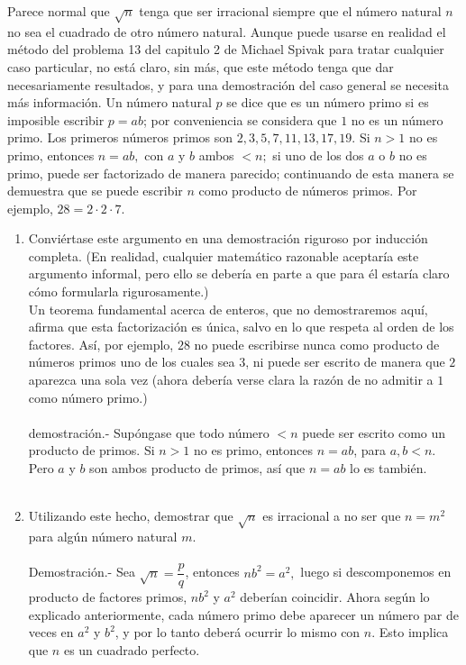 \begin{teo}
Parece normal que $\sqrt{n}$ tenga que ser irracional siempre que el número natural $n$ no sea el cuadrado de otro número natural. Aunque puede usarse en realidad el método del problema 13 del capitulo 2 de Michael Spivak para tratar cualquier caso particular, no está claro, sin más, que este método tenga que dar necesariamente resultados, y para una demostración del caso general se necesita más información. Un número natural $p$ se dice que es un número primo si es imposible escribir $p=ab$; por conveniencia se considera que $1$ no es un número primo. Los primeros números primos son $2,3,5,7,11,13,17,19.$ Si $n>1$ no es primo, entonces $n=ab,$ con $a$ \; y \; $b$ ambos $<n;$ si uno de los dos $a$ \; o \; $b$ no es primo, puede ser factorizado de manera parecido; continuando de esta manera se demuestra que se puede escribir $n$ como producto de números primos. Por ejemplo, $28=2\cdot 2\cdot 7.$\\
\begin{enumerate}[\bfseries a)]
\item Conviértase este argumento en una demostración riguroso por inducción completa. (En realidad, cualquier matemático razonable aceptaría este argumento informal, pero ello se debería en parte a que para él estaría claro cómo formularla rigurosamente.)\\
Un teorema fundamental acerca de enteros, que no demostraremos aquí, afirma que esta factorización es única, salvo en lo que respeta al orden de los factores. Así, por ejemplo, $28$ no puede escribirse nunca como producto de números primos uno de los cuales sea $3$, ni puede ser escrito de manera que $2$ aparezca una sola vez (ahora debería verse clara la razón de no admitir a $1$ como número primo.)\\\\
demostración.- \; Supóngase que todo número $<n$ puede ser escrito  como un producto de primos. Si $n>1$ no es primo, entonces $n=ab$, para $a,b<n$. Pero $a$ \; y \; $b$ son ambos producto de primos, así que $n=ab$ lo es también.\\\\

\item Utilizando este hecho, demostrar que $\sqrt{n}$ es irracional a no ser que $n=m^2$ para algún número natural $m.$\\\\
Demostración.- \; Sea $\sqrt{n} = \dfrac{p}{q}$, entonces $nb^2 = a^2,$  luego si descomponemos en producto de factores primos, $nb^2$ y $a^2$ deberían coincidir. Ahora según lo explicado anteriormente, cada número primo debe aparecer un número par de veces en $a^2$ y $b^2$, y por lo tanto deberá ocurrir lo mismo con $n.$ Esto implica que $n$ es un cuadrado perfecto.\\\\


\end{enumerate}
\end{teo}
